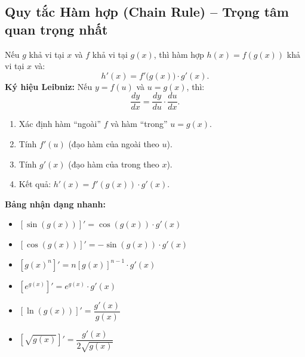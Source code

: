 \documentclass[12pt,a4paper]{article}
\begin{document}
\subsection{Quy tắc Hàm hợp (Chain Rule) -- Trọng tâm quan trọng nhất}

\begin{dinhly}[title={Chain Rule}]
  Nếu $g$ khả vi tại $x$ và $f$ khả vi tại $g(x)$, thì hàm hợp $h(x) = f(g(x))$ khả vi tại $x$ và:
  \[
    h'(x) = f'\bigl(g(x)\bigr) \cdot g'(x).
  \]
  \textbf{Ký hiệu Leibniz:} Nếu $y = f(u)$ và $u = g(x)$, thì:
  \[
    \dfrac{dy}{dx} = \dfrac{dy}{du} \cdot \dfrac{du}{dx}.
  \]
\end{dinhly}

\begin{phuongphap}[title={Nhận dạng và áp dụng Chain Rule}]
  \begin{enumerate}
    \item Xác định hàm ``ngoài'' $f$ và hàm ``trong'' $u = g(x)$.
    \item Tính $f'(u)$ (đạo hàm của ngoài theo $u$).
    \item Tính $g'(x)$ (đạo hàm của trong theo $x$).
    \item Kết quả: $h'(x) = f'(g(x)) \cdot g'(x)$.
  \end{enumerate}

  \textbf{Bảng nhận dạng nhanh:}
  \begin{itemize}
    \item $[\sin(g(x))]' = \cos(g(x)) \cdot g'(x)$
    \item $[\cos(g(x))]' = -\sin(g(x)) \cdot g'(x)$
    \item $[g(x)^n]' = n[g(x)]^{n-1} \cdot g'(x)$
    \item $[e^{g(x)}]' = e^{g(x)} \cdot g'(x)$
    \item $[\ln(g(x))]' = \dfrac{g'(x)}{g(x)}$
    \item $[\sqrt{g(x)}]' = \dfrac{g'(x)}{2\sqrt{g(x)}}$
  \end{itemize}
\end{phuongphap}
\end{document}
